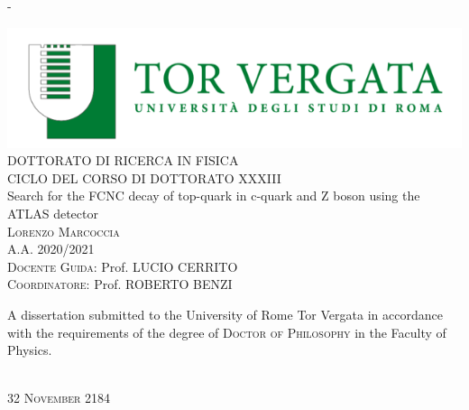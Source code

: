 
\begin{adjustwidth*}{\unitlength}{-\unitlength}
	\begin{center}
		\includegraphics[scale=1]{frontmatter/figures/uniroma2}\\
		\vspace{1cm}
		{\large\textsc{DOTTORATO DI RICERCA IN FISICA}}\\
		\vspace{0.8cm}
		{\large\textsc{CICLO DEL CORSO DI DOTTORATO XXXIII}}\\
		\vspace{1cm}
		{\LARGE{Search for the FCNC decay of top-quark in c-quark and Z boson using the ATLAS detector}}\\
		\vspace{6.5mm}
		{\large\textsc{Lorenzo Marcoccia}}\\
		\vspace{1cm}
		{\large\textsc{A.A. 2020/2021}}\\
		\vspace{10mm}
		{\large{\textsc{Docente Guida:}  Prof. LUCIO CERRITO}}\\ 
		\vspace{5mm}
		{\large{\textsc{Coordinatore:   }  Prof. ROBERTO BENZI}}\\ 
		\vspace{3mm}
		\begin{minipage}{10cm}
			\vspace{1cm}
			A dissertation submitted to the University of Rome Tor Vergata  in accordance with the requirements of the degree of \textsc{Doctor of Philosophy} in the Faculty of Physics.
		\end{minipage}\\
		\vspace{9mm}
		{\large\textsc{32 November 2184}}
		\vspace{12mm}
	\end{center}
\end{adjustwidth*}
